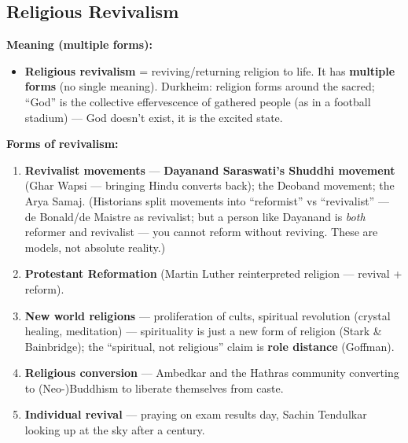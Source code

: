 \sectiondivider

\subsection{Religious Revivalism}

\begin{KeyConcept}
\textbf{Meaning (multiple forms):}
\begin{itemize}
\item \textbf{Religious revivalism} = reviving/returning religion to life. It has \textbf{multiple forms} (no single meaning). Durkheim: religion forms around the sacred; ``God'' is the collective effervescence of gathered people (as in a football stadium) --- God doesn't exist, it is the excited state.
\end{itemize}
\end{KeyConcept}

\begin{DataFact}
\textbf{Forms of revivalism:}
\begin{enumerate}
\item \textbf{Revivalist movements} --- \textbf{Dayanand Saraswati's Shuddhi movement} (Ghar Wapsi --- bringing Hindu converts back); the Deoband movement; the Arya Samaj. (Historians split movements into ``reformist'' vs ``revivalist'' --- de Bonald/de Maistre as revivalist; but a person like Dayanand is \textit{both} reformer and revivalist --- you cannot reform without reviving. These are models, not absolute reality.)
\item \textbf{Protestant Reformation} (Martin Luther reinterpreted religion --- revival + reform).
\item \textbf{New world religions} --- proliferation of cults, spiritual revolution (crystal healing, meditation) --- spirituality is just a new form of religion (Stark \& Bainbridge); the ``spiritual, not religious'' claim is \textbf{role distance} (Goffman).
\item \textbf{Religious conversion} --- Ambedkar and the Hathras community converting to (Neo-)Buddhism to liberate themselves from caste.
\item \textbf{Individual revival} --- praying on exam results day, Sachin Tendulkar looking up at the sky after a century.
\end{enumerate}
\end{DataFact}

